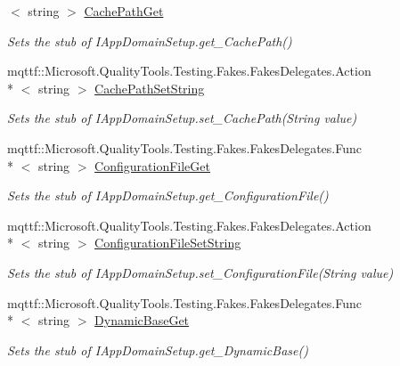 \begin{DoxyCompactItemize}
$<$ string $>$ \hyperlink{class_system_1_1_fakes_1_1_stub_i_app_domain_setup_a795a73390875e94d9958f79a9c26921c}{Cache\-Path\-Get}
\begin{DoxyCompactList}\small\item\em Sets the stub of I\-App\-Domain\-Setup.\-get\-\_\-\-Cache\-Path()\end{DoxyCompactList}\item 
mqttf\-::\-Microsoft.\-Quality\-Tools.\-Testing.\-Fakes.\-Fakes\-Delegates.\-Action\\*
$<$ string $>$ \hyperlink{class_system_1_1_fakes_1_1_stub_i_app_domain_setup_acd02e201f2d7a11c5b72337a9e6eedc7}{Cache\-Path\-Set\-String}
\begin{DoxyCompactList}\small\item\em Sets the stub of I\-App\-Domain\-Setup.\-set\-\_\-\-Cache\-Path(\-String value)\end{DoxyCompactList}\item 
mqttf\-::\-Microsoft.\-Quality\-Tools.\-Testing.\-Fakes.\-Fakes\-Delegates.\-Func\\*
$<$ string $>$ \hyperlink{class_system_1_1_fakes_1_1_stub_i_app_domain_setup_a58980113b40f58d86c0c2d30a4466767}{Configuration\-File\-Get}
\begin{DoxyCompactList}\small\item\em Sets the stub of I\-App\-Domain\-Setup.\-get\-\_\-\-Configuration\-File()\end{DoxyCompactList}\item 
mqttf\-::\-Microsoft.\-Quality\-Tools.\-Testing.\-Fakes.\-Fakes\-Delegates.\-Action\\*
$<$ string $>$ \hyperlink{class_system_1_1_fakes_1_1_stub_i_app_domain_setup_a5bcfc179fc0a8147049ffe98908768e4}{Configuration\-File\-Set\-String}
\begin{DoxyCompactList}\small\item\em Sets the stub of I\-App\-Domain\-Setup.\-set\-\_\-\-Configuration\-File(\-String value)\end{DoxyCompactList}\item 
mqttf\-::\-Microsoft.\-Quality\-Tools.\-Testing.\-Fakes.\-Fakes\-Delegates.\-Func\\*
$<$ string $>$ \hyperlink{class_system_1_1_fakes_1_1_stub_i_app_domain_setup_a8989f5c25e148d5d235ba2fbec37de64}{Dynamic\-Base\-Get}
\begin{DoxyCompactList}\small\item\em Sets the stub of I\-App\-Domain\-Setup.\-get\-\_\-\-Dynamic\-Base()\end{DoxyCompactList}\item 

\end{DoxyCompactItemize}
